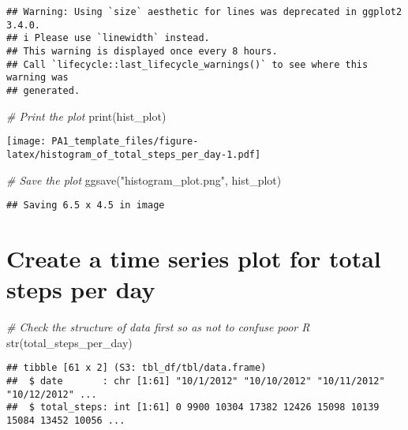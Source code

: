 \documentclass[
]{article}
\newenvironment{Shaded}{\begin{snugshade}}{\end{snugshade}}
\newcommand{\CommentTok}[1]{\textcolor[rgb]{0.56,0.35,0.01}{\textit{#1}}}
\newcommand{\FunctionTok}[1]{\textcolor[rgb]{0.00,0.00,0.00}{#1}}
\newcommand{\NormalTok}[1]{#1}
\newcommand{\StringTok}[1]{\textcolor[rgb]{0.31,0.60,0.02}{#1}}
\begin{document}
\begin{verbatim}
## Warning: Using `size` aesthetic for lines was deprecated in ggplot2 3.4.0.
## i Please use `linewidth` instead.
## This warning is displayed once every 8 hours.
## Call `lifecycle::last_lifecycle_warnings()` to see where this warning was
## generated.
\end{verbatim}

\begin{Shaded}
\begin{Highlighting}[]
\CommentTok{\# Print the plot}
\FunctionTok{print}\NormalTok{(hist\_plot)}
\end{Highlighting}
\end{Shaded}

\texttt{[image: PA1\_template\_files/figure-latex/histogram\_of\_total\_steps\_per\_day-1.pdf]}

\begin{Shaded}
\begin{Highlighting}[]
\CommentTok{\# Save the plot}
\FunctionTok{ggsave}\NormalTok{(}\StringTok{"histogram\_plot.png"}\NormalTok{, hist\_plot)}
\end{Highlighting}
\end{Shaded}

\begin{verbatim}
## Saving 6.5 x 4.5 in image
\end{verbatim}

\hypertarget{create-a-time-series-plot-for-total-steps-per-day}{%
\section{Create a time series plot for total steps per
day}\label{create-a-time-series-plot-for-total-steps-per-day}}

\begin{Shaded}
\begin{Highlighting}[]
\CommentTok{\# Check the structure of data first so as not to confuse poor R}
\FunctionTok{str}\NormalTok{(total\_steps\_per\_day)}
\end{Highlighting}
\end{Shaded}

\begin{verbatim}
## tibble [61 x 2] (S3: tbl_df/tbl/data.frame)
##  $ date       : chr [1:61] "10/1/2012" "10/10/2012" "10/11/2012" "10/12/2012" ...
##  $ total_steps: int [1:61] 0 9900 10304 17382 12426 15098 10139 15084 13452 10056 ...
\end{verbatim}
\end{document}
